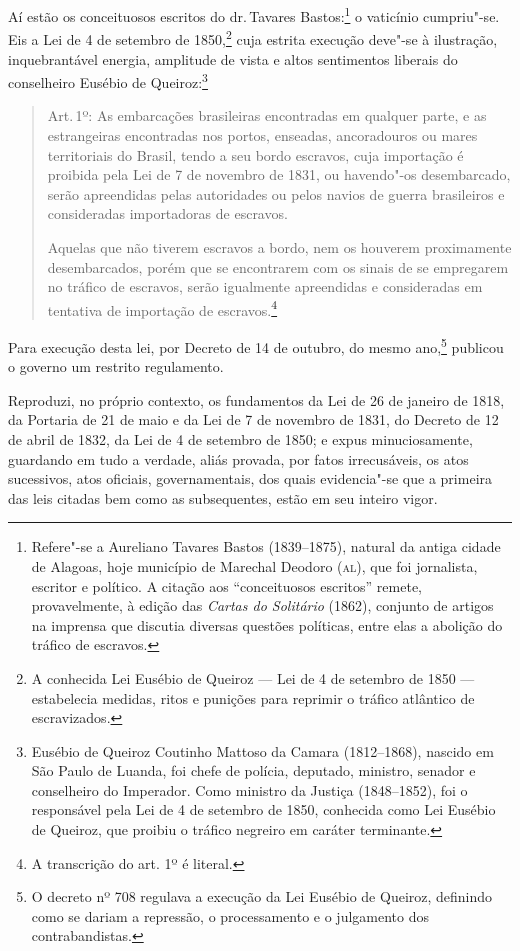 Aí estão os conceituosos escritos do dr.\,Tavares Bastos:\footnote{
  Refere"-se a Aureliano Tavares Bastos (1839--1875), natural da antiga
  cidade de Alagoas, hoje município de Marechal Deodoro (\textsc{al}), que foi
  jornalista, escritor e político. A citação aos ``conceituosos escritos''
  remete, provavelmente, à edição das \emph{Cartas do Solitário} (1862),
  conjunto de artigos na imprensa que discutia diversas questões
  políticas, entre elas a abolição do tráfico de escravos.} o vaticínio
cumpriu"-se. Eis a Lei de 4 de setembro de 1850,\footnote{A conhecida
  Lei Eusébio de Queiroz --- Lei de 4 de setembro de 1850 --- estabelecia
  medidas, ritos e punições para reprimir o tráfico atlântico de
  escravizados.} cuja estrita execução deve"-se à ilustração,
inquebrantável energia, amplitude de vista e altos sentimentos liberais
do conselheiro Eusébio de Queiroz:\footnote{Eusébio de Queiroz
  Coutinho Mattoso da Camara (1812--1868), nascido em São Paulo de
  Luanda, foi chefe de polícia, deputado, ministro, senador e
  conselheiro do Imperador. Como ministro da Justiça (1848--1852), foi o
  responsável pela Lei de 4 de setembro de 1850, conhecida como Lei
  Eusébio de Queiroz, que proibiu o tráfico negreiro em caráter
  terminante.}

\begin{quote}
Art.\,1º: As embarcações brasileiras encontradas em qualquer parte, e as
estrangeiras encontradas nos portos, enseadas, ancoradouros ou mares
territoriais do Brasil, tendo a seu bordo escravos, cuja importação é
proibida pela Lei de 7 de novembro de 1831, ou havendo"-os desembarcado,
serão apreendidas pelas autoridades ou pelos navios de guerra
brasileiros e consideradas importadoras de escravos.

Aquelas que não tiverem escravos a bordo, nem os houverem proximamente
desembarcados, porém que se encontrarem com os sinais de se empregarem
no tráfico de escravos, serão igualmente apreendidas e consideradas em
tentativa de importação de escravos.\footnote{A transcrição do art.
  1º é literal.}
\end{quote}  

Para execução desta lei, por Decreto de 14 de outubro, do mesmo
ano,\footnote{O decreto nº 708 regulava a execução da Lei Eusébio de
  Queiroz, definindo como se dariam a repressão, o processamento e o
  julgamento dos contrabandistas.} publicou o governo um restrito
regulamento.

\asterisc

Reproduzi, no próprio contexto, os fundamentos da Lei de 26 de janeiro
de 1818, da Portaria de 21 de maio e da Lei de 7 de novembro de 1831, do
Decreto de 12 de abril de 1832, da Lei de 4 de setembro de 1850; e expus
minuciosamente, guardando em tudo a verdade, aliás provada, por fatos
irrecusáveis, os atos sucessivos, atos oficiais, governamentais, dos
quais evidencia"-se que a primeira das leis citadas bem como as
subsequentes, estão em seu inteiro vigor.

